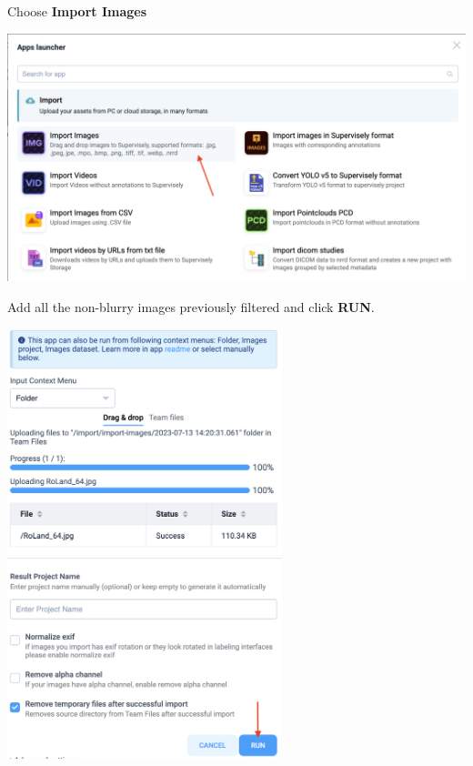 \documentclass[12pt]{article}
\begin{document}
Choose \textbf{Import Images}
\begin{center}
\includegraphics[width=1.0\textwidth]{Bilder/upload_2}
\end{center}

Add all the non-blurry images previously filtered and click \textbf{RUN}.

\begin{center}
\includegraphics[width=0.6\textwidth]{Bilder/upload_3}
\end{center}
\newpage
\end{document}
